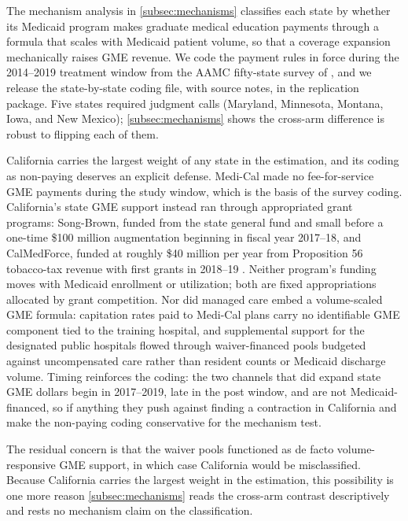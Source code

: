 The mechanism analysis in \cref{subsec:mechanisms} classifies each state by whether its Medicaid program makes graduate medical education payments through a formula that scales with Medicaid patient volume, so that a coverage expansion mechanically raises GME revenue. We code the payment rules in force during the 2014--2019 treatment window from the AAMC fifty-state survey of \textcite{henderson2016}, and we release the state-by-state coding file, with source notes, in the replication package. Five states required judgment calls (Maryland, Minnesota, Montana, Iowa, and New Mexico); \cref{subsec:mechanisms} shows the cross-arm difference is robust to flipping each of them.

California carries the largest weight of any state in the estimation, and its coding as non-paying deserves an explicit defense. Medi-Cal made no fee-for-service GME payments during the study window, which is the basis of the survey coding. California's state GME support instead ran through appropriated grant programs: Song-Brown, funded from the state general fund and small before a one-time \$100 million augmentation beginning in fiscal year 2017--18, and CalMedForce, funded at roughly \$40 million per year from Proposition 56 tobacco-tax revenue with first grants in 2018--19 \autocite{chcf2024, lao2019}. Neither program's funding moves with Medicaid enrollment or utilization; both are fixed appropriations allocated by grant competition. Nor did managed care embed a volume-scaled GME formula: capitation rates paid to Medi-Cal plans carry no identifiable GME component tied to the training hospital, and supplemental support for the designated public hospitals flowed through waiver-financed pools budgeted against uncompensated care rather than resident counts or Medicaid discharge volume. Timing reinforces the coding: the two channels that did expand state GME dollars begin in 2017--2019, late in the post window, and are not Medicaid-financed, so if anything they push against finding a contraction in California and make the non-paying coding conservative for the mechanism test.

The residual concern is that the waiver pools functioned as de facto volume-responsive GME support, in which case California would be misclassified. Because California carries the largest weight in the estimation, this possibility is one more reason \cref{subsec:mechanisms} reads the cross-arm contrast descriptively and rests no mechanism claim on the classification.

\pagebreak
